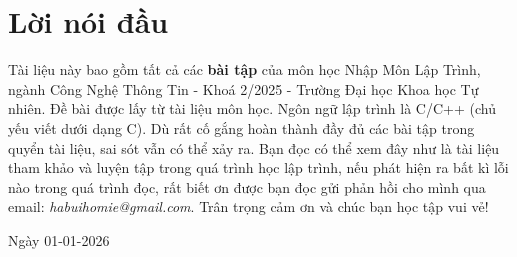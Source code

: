 \chapter*{Lời nói đầu}
Tài liệu này bao gồm tất cả các \textbf{bài tập} của môn học Nhập Môn Lập Trình, ngành Công Nghệ Thông Tin - Khoá 2/2025 - Trường Đại học Khoa học Tự nhiên. Đề bài được lấy từ tài liệu môn học. Ngôn ngữ lập trình là C/C++ (chủ yếu viết dưới dạng C). Dù rất cố gắng hoàn thành đầy đủ các bài tập trong quyển tài liệu, sai sót vẫn có thể xảy ra. Bạn đọc có thể xem đây như là tài liệu tham khảo và luyện tập trong quá trình học lập trình, nếu phát hiện ra bất kì lỗi nào trong quá trình đọc, rất biết ơn được bạn đọc gửi phản hồi cho mình qua email: \textit{habuihomie@gmail.com}. Trân trọng cảm ơn và chúc bạn học tập vui vẻ!

Ngày 01-01-2026